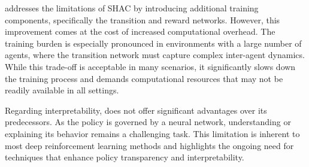 \fname{} addresses the limitations of SHAC by introducing additional training components, specifically the transition and reward networks. However, this improvement comes at the cost of increased computational overhead. The training burden is especially pronounced in environments with a large number of agents, where the transition network must capture complex inter-agent dynamics. While this trade-off is acceptable in many scenarios, it significantly slows down the training process and demands computational resources that may not be readily available in all settings.

Regarding interpretability, \fname{} does not offer significant advantages over its predecessors. As the policy is governed by a neural network, understanding or explaining its behavior remains a challenging task. This limitation is inherent to most deep reinforcement learning methods and highlights the ongoing need for techniques that enhance policy transparency and interpretability.

